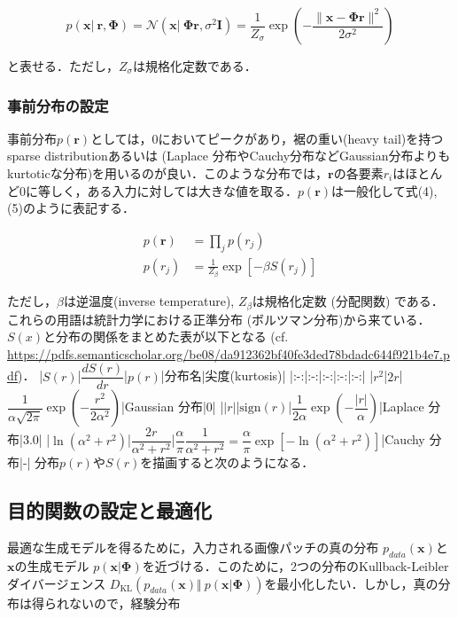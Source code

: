 \begin{equation}
p(\mathbf{x}|\ \mathbf{r}, \mathbf{\Phi})=\mathcal{N}\left(\mathbf{x}|\ \mathbf{\Phi} \mathbf{r}, \sigma^2 \mathbf{I} \right)=\frac{1}{Z_{\sigma}} \exp\left(-\frac{\|\mathbf{x} - \mathbf{\Phi} \mathbf{r}\|^2}{2\sigma^2}\right)
\end{equation}


と表せる．ただし，$Z_{\sigma}$は規格化定数である．
\subsubsection{事前分布の設定}
事前分布$p(\mathbf{r})$としては，0においてピークがあり，裾の重い(heavy tail)を持つsparse distributionあるいは \textbf{} (Laplace 分布やCauchy分布などGaussian分布よりもkurtoticな分布)を用いるのが良い．このような分布では，$\mathbf{r}$の各要素$r_i$はほとんど0に等しく，ある入力に対しては大きな値を取る．$p(\mathbf{r})$は一般化して式(4), (5)のように表記する．


\begin{align}
p(\mathbf{r})&=\prod_j p(r_j)\\
p(r_j)&=\frac{1}{Z_{\beta}}\exp \left[-\beta S(r_j)\right]
\end{align}


ただし，$\beta$は逆温度(inverse temperature), $Z_{\beta}$は規格化定数 (分配関数) である．これらの用語は統計力学における正準分布 (ボルツマン分布)から来ている．$S(x)$と分布の関係をまとめた表が以下となる (cf. \url{https://pdfs.semanticscholar.org/be08/da912362bf40fe3ded78bdadc644f921b4e7.pdf})．
|$S(r)$|$\dfrac{dS(r)}{dr}$|$p(r)$|分布名|尖度(kurtosis)|
|:-:|:-:|:-:|:-:|:-:|
|$r^2$|$2r$|$\dfrac{1}{\alpha \sqrt{2\pi}}\exp\left(-\dfrac{r^2}{2\alpha^2}\right)$|Gaussian 分布|0|
|$\vert r\vert$|$\text{sign}(r)$|$\dfrac{1}{2\alpha}\exp\left(-\dfrac{\vert r\vert}{\alpha}\right)$|Laplace 分布|3.0|
|$\ln (\alpha^2+r^2)$|$\dfrac{2r}{\alpha^2+r^2}$|$\dfrac{\alpha}{\pi}\dfrac{1}{\alpha^2+r^2}=\dfrac{\alpha}{\pi}\exp[-\ln (\alpha^2+r^2)]$|Cauchy 分布|-|
分布$p(r)$や$S(r)$を描画すると次のようになる．


\subsection{目的関数の設定と最適化}
最適な生成モデルを得るために，入力される画像パッチの真の分布 $p_{data}(\mathbf{x})$と$\mathbf{x}$の生成モデル $p(\mathbf{x}|\mathbf{\Phi})$を近づける．このために，2つの分布のKullback-Leibler ダイバージェンス $D_{\text{KL}}\left(p_{data}(\mathbf{x}) \Vert\ p(\mathbf{x}|\mathbf{\Phi})\right)$を最小化したい．しかし，真の分布は得られないので，経験分布 



